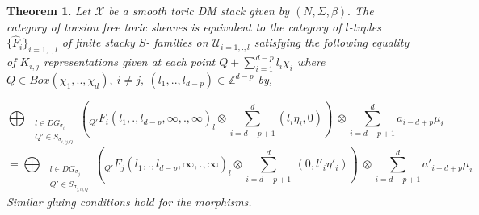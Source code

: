 \documentclass[10pt]{amsart}
\newtheorem{thm}[prop]{Theorem}
\newcommand{\sX}{{\mathcal X}}
\numberwithin{equation}{subsection}
\begin{document}
\begin{thm}\label{Gluing Formula}
Let $\sX$ be a smooth toric DM stack given by $(N,\Sigma,\beta).$ 
The category of torsion free toric sheaves is equivalent to the category of $l$-tuples $\{\hat{F}_i\}_{i=1,.,l}$ of finite stacky $S$- families on $\mathscr{U}_{i=1,.,l}$ satisfying the following equality of $K_{i,j}$ representations given at each point $Q+\sum_{i=1}^{d-p}l_i\chi_i$ where $Q\in Box(\chi_1,..,\chi_d),\ i\neq j, \ (l_1,..,l_{d-p})\in \mathbb{Z}^{d-p}$ by,

$$\bigoplus_{\begin{array}{cc}
     &  l\in DG_{\sigma_i}\\
     & Q'\in S_{\sigma_{i,ij,Q}}
\end{array}} ({}_{Q'}F_{i}(l_1,.,l_{d-p},\infty,.,\infty)_{l} \otimes\sum_{i=d-p+1}^{d}(l_{i}\eta_{i},0))\ \otimes\sum_{i=d-p+1}^{d}a_{i-d+p}\mu_{i}$$
$$=\bigoplus_{{\begin{array}{cc}
     &  l\in DG_{\sigma_j}\\
     & Q'\in S_{\sigma_{j,ij,Q}}
\end{array}}}({}_{Q'}F_{j}(l_1,.,l_{d-p},\infty,.,\infty)_{l}\otimes\sum_{i=d-p+1}^{d}\ (0,l'_i\eta'_i))\ \otimes \sum_{i=d-p+1}^{d}a'_{i-d+p}\mu_{i}\ $$
Similar gluing conditions hold for the morphisms.
\end{thm}
\end{document}
